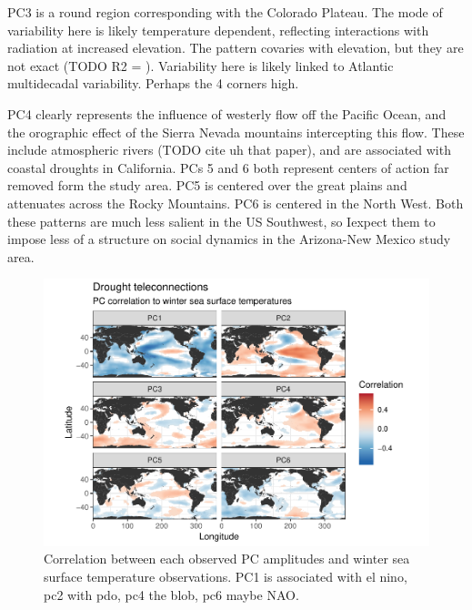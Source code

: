 \documentclass[11pt]{wlscirep}
\begin{document}
PC3 is a round region corresponding with the Colorado Plateau. The mode of variability here is likely temperature dependent, reflecting interactions with radiation at increased elevation. The pattern covaries with elevation, but they are not exact (TODO R2 = ). Variability here is likely linked to Atlantic multidecadal variability. Perhaps the 4 corners high.

PC4 clearly represents the influence of westerly flow off the Pacific Ocean, and the orographic effect of the Sierra Nevada mountains intercepting this flow. These include atmospheric rivers (TODO cite uh that paper), and are associated with coastal droughts in California. PCs 5 and 6 both represent centers of action far removed form the study area. PC5 is centered over the great plains and attenuates across the Rocky Mountains. PC6 is centered in the North West. Both these patterns are much less salient in the US Southwest, so Iexpect them to impose less of a structure on social dynamics in the Arizona-New Mexico study area.


\begin{figure}[!ht]
\centering
\includegraphics[width=.8\linewidth]{figures/sst_correlation.pdf}
\caption{Correlation between each observed PC amplitudes and winter sea surface temperature observations. PC1 is associated with el nino, pc2 with pdo, pc4 the blob, pc6 maybe NAO.}
\label{fig:sst-correlation}
\end{figure}
\end{document}
